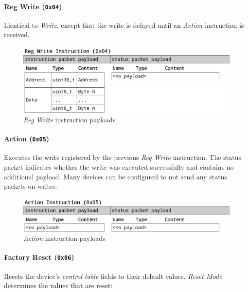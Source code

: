 \paragraph{Reg Write (\lstinline{0x04})}

Identical to \textit{Write}, except that the write is delayed until an \textit{Action} instruction
is received.

\begin{figure}[H]
    \centering
    \includegraphics[scale=0.2]{img/reg_write_packet.png}
    \caption{\textit{Reg Write} instruction payloads}
\end{figure}

\paragraph{Action (\lstinline{0x05})}

Executes the write registered by the previous \textit{Reg Write} instruction. The status packet
indicates whether the write was executed successfully and contains no additional payload. Many
devices can be configured to not send any status packets on writes.

\begin{figure}[H]
    \centering
    \includegraphics[scale=0.2]{img/action_packet.png}
    \caption{\textit{Action} instruction payloads}
\end{figure}

\paragraph{Factory Reset (\lstinline{0x06})}

Resets the device's \textit{control table} fields to their default values. \textit{Reset Mode}
determines the values that are reset:

